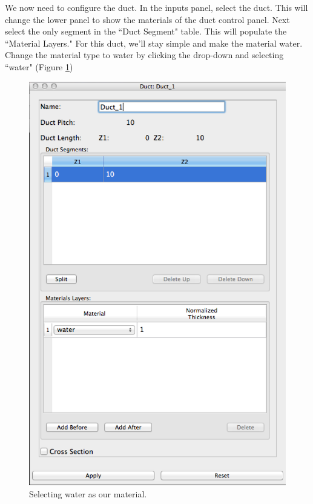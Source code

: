 We now need to configure the duct.  In the inputs panel, select the duct.   This will change the lower panel to show the materials of the duct control panel.  Next select the only segment in the ``Duct Segment" table.  This will populate the ``Material Layers."   For this duct, we'll stay simple and make the material water.  Change the material type to water by clicking the drop-down and selecting ``water" (Figure \ref{fig:Hex7})

\begin{figure}[t]
\centering
\begin{minipage}{.45\textwidth}
       \begin{center}
		\includegraphics[width=0.85\linewidth]{Images/hex-set-duct-material.png}
		\caption{Selecting water as our material.}
		\label{fig:Hex7}
	\end{center}
\end{minipage} \hspace{.5cm}%
\begin{minipage}{.5\textwidth}

\end{minipage}
\end{figure}
